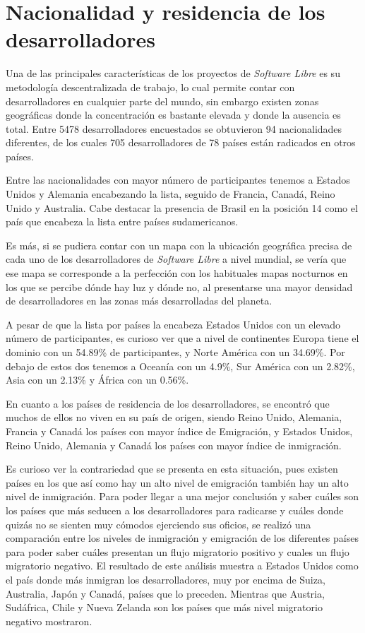 \section{Nacionalidad y residencia de los desarrolladores}

Una de las principales características de los proyectos de \textit{Software Libre} es su metodología descentralizada de trabajo, lo cual permite contar con desarrolladores en cualquier parte del mundo, sin embargo existen zonas geográficas donde la concentración es bastante elevada y donde la ausencia es total. Entre 5478 desarrolladores encuestados se obtuvieron 94 nacionalidades diferentes, de los cuales 705 desarrolladores de 78 países están radicados en otros países. 

Entre las nacionalidades con mayor número de participantes tenemos a Estados Unidos y Alemania encabezando la lista, seguido de Francia, Canadá, Reino Unido y Australia. Cabe destacar la presencia de Brasil en la posición 14 como el país que encabeza la lista entre países sudamericanos.

Es más, si se pudiera contar con un mapa con la ubicación geográfica precisa de cada uno de los desarrolladores de \textit{Software Libre} a nivel mundial, se vería que ese mapa se corresponde a la perfección con los habituales mapas nocturnos en los que se percibe dónde hay luz y dónde no, al presentarse una mayor densidad de desarrolladores en las zonas más desarrolladas del planeta.

A pesar de que la lista por países la encabeza Estados Unidos con un elevado número de participantes, es curioso ver que a nivel de continentes Europa tiene el dominio con un 54.89\% de participantes, y Norte América con un 34.69\%. Por debajo de estos dos tenemos a Oceanía con un 4.9\%, Sur América con un 2.82\%, Asia con un 2.13\% y África con un 0.56\%.

En cuanto a los países de residencia de los desarrolladores, se encontró que muchos de ellos no viven en su país de origen, siendo Reino Unido, Alemania, Francia y Canadá los países con mayor índice de Emigración, y Estados Unidos, Reino Unido, Alemania y Canadá los países con mayor índice de inmigración. 

Es curioso ver la contrariedad que se presenta en esta situación, pues existen países en los que así como hay un alto nivel de emigración también hay un alto nivel de inmigración. Para poder llegar a una mejor conclusión y saber cuáles son los países que más seducen a los desarrolladores para radicarse y cuáles donde quizás no se sienten muy cómodos ejerciendo sus oficios, se realizó una comparación entre los niveles de inmigración y emigración de los diferentes países para poder saber cuáles presentan un flujo migratorio positivo  y cuales un flujo migratorio negativo. El resultado de este análisis muestra a Estados Unidos como el país donde más inmigran los desarrolladores, muy por encima de Suiza, Australia, Japón y Canadá, países que lo preceden. Mientras que Austria, Sudáfrica, Chile y Nueva Zelanda son los países que más nivel migratorio negativo mostraron.

